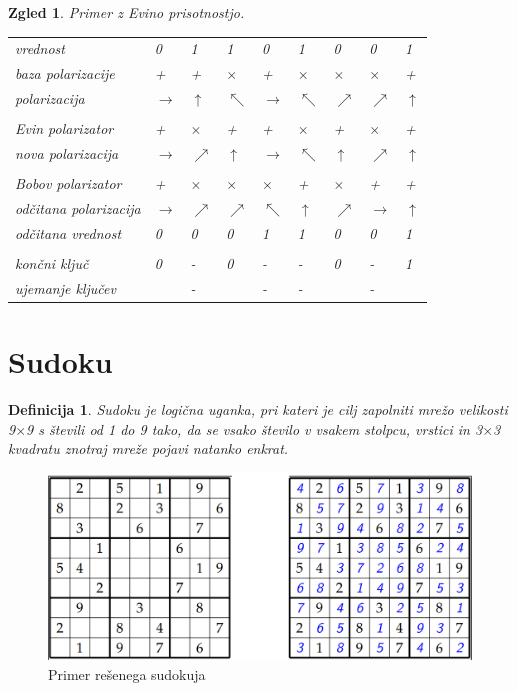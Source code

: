 \documentclass[A4paper, 11pt]{article}
\newtheorem{definicija}{Definicija}
\newtheorem{zgled}{Zgled}
\newcommand{\cmark}{\ding{51}}
\newcommand{\xmark}{\ding{55}}
\begin{document}
\begin{zgled} 
Primer z Evino prisotnostjo.

\begin{center}
\begin{tabular}{ l m{0.3 cm} m{0.3 cm} m{0.3 cm} m{0.3 cm} m{0.3 cm} m{0.3 cm} m{0.3 cm} m{0.3 cm}}
vrednost & 0 & 1 & 1 & 0 & 1 & 0 & 0 & 1\\
baza polarizacije & + & + & $\times$ & + & $\times$ & $\times$ & $\times$ & + \\
polarizacija & $\rightarrow$ & $\uparrow$ & $\nwarrow$ & $\rightarrow$ & $\nwarrow$ & $\nearrow$ & $\nearrow$  & $\uparrow$\\
\\
Evin polarizator & + & $\times$ & + & + & $\times$ & + & $\times$ & +\\
nova polarizacija & $\rightarrow$ & $\nearrow$ & $\uparrow$ & $\rightarrow$ & $\nwarrow$  & $\uparrow$ & $\nearrow$ & $\uparrow$\\
\\
Bobov polarizator & + & $\times$ & $\times$ & $\times$ & + & $\times$ & + & +\\
odčitana polarizacija & $\rightarrow$ & $\nearrow$ & $\nearrow$ & $\nwarrow$ & $\uparrow$  & $\nearrow$ & $\rightarrow$ & $\uparrow$\\
odčitana vrednost & 0 & 0 & 0 & 1 & 1 & 0 & 0 & 1\\
\\
končni ključ & 0 & - & 0 & - & - & 0 & - & 1\\
ujemanje ključev & \cmark & - & \xmark & - & - & \cmark & - & \cmark\\ 
\end{tabular}
\end{center}

\end{zgled}



\section{Sudoku}

\begin{definicija}
Sudoku je logična uganka, pri kateri je cilj zapolniti mrežo velikosti 9$\times$9 s števili od 1 do 9 tako, da se vsako število v vsakem stolpcu, vrstici in 3$\times$3 kvadratu znotraj mreže pojavi natanko enkrat.
\end{definicija}

\begin{figure}[h]
\centering
\caption{Primer rešenega sudokuja}
\includegraphics[scale=0.4]{sudoku_resen}
\end{figure}
\end{document}
